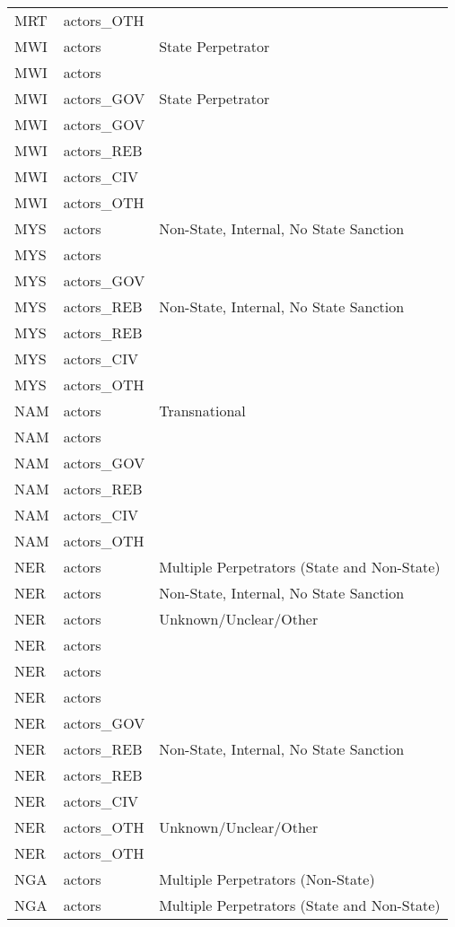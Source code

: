 \begin{table}[ht]
\begin{tabular}{lll}
  MRT & actors\_OTH &  \\ 
  MWI & actors & State Perpetrator \\ 
  MWI & actors &  \\ 
  MWI & actors\_GOV & State Perpetrator \\ 
  MWI & actors\_GOV &  \\ 
  MWI & actors\_REB &  \\ 
  MWI & actors\_CIV &  \\ 
  MWI & actors\_OTH &  \\ 
  MYS & actors & Non-State, Internal, No State Sanction \\ 
  MYS & actors &  \\ 
  MYS & actors\_GOV &  \\ 
  MYS & actors\_REB & Non-State, Internal, No State Sanction \\ 
  MYS & actors\_REB &  \\ 
  MYS & actors\_CIV &  \\ 
  MYS & actors\_OTH &  \\ 
  NAM & actors & Transnational \\ 
  NAM & actors &  \\ 
  NAM & actors\_GOV &  \\ 
  NAM & actors\_REB &  \\ 
  NAM & actors\_CIV &  \\ 
  NAM & actors\_OTH &  \\ 
  NER & actors & Multiple Perpetrators (State and Non-State) \\ 
  NER & actors & Non-State, Internal, No State Sanction \\ 
  NER & actors & Unknown/Unclear/Other \\ 
  NER & actors &  \\ 
  NER & actors &  \\ 
  NER & actors &  \\ 
  NER & actors\_GOV &  \\ 
  NER & actors\_REB & Non-State, Internal, No State Sanction \\ 
  NER & actors\_REB &  \\ 
  NER & actors\_CIV &  \\ 
  NER & actors\_OTH & Unknown/Unclear/Other \\ 
  NER & actors\_OTH &  \\ 
  NGA & actors & Multiple Perpetrators (Non-State) \\ 
  NGA & actors & Multiple Perpetrators (State and Non-State) \\ 

\end{tabular}
\end{table}
